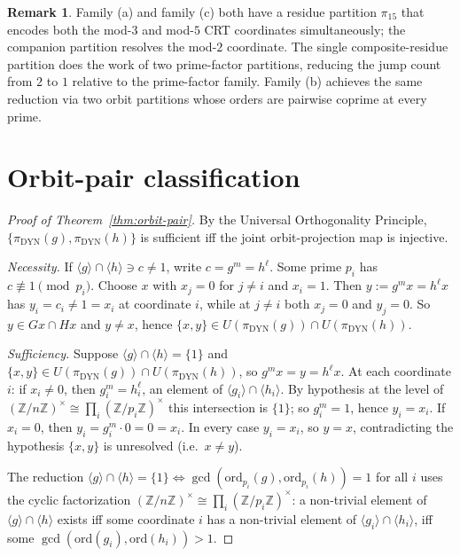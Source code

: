 \documentclass[11pt,reqno]{amsart}
\theoremstyle{plain}
\theoremstyle{definition}
\newtheorem{remark}[theorem]{Remark}
\newcommand{\Z}{\mathbb{Z}}
\newcommand{\Zns}{(\Z/n\Z)^{\times}}
\newcommand{\DYN}{\mathrm{DYN}}
\newcommand{\ord}{\mathrm{ord}}
\begin{document}
\begin{remark}
Family (a) and family (c) both have a residue partition $\pi_{15}$ that encodes both the mod-$3$ and mod-$5$ CRT coordinates simultaneously; the companion partition resolves the mod-$2$ coordinate. The single composite-residue partition does the work of two prime-factor partitions, reducing the jump count from $2$ to $1$ relative to the prime-factor family. Family (b) achieves the same reduction via two orbit partitions whose orders are pairwise coprime at every prime.
\end{remark}

\section{Orbit-pair classification} \label{sec:orbit-pair}

\begin{proof}[Proof of Theorem~\ref{thm:orbit-pair}]
By the Universal Orthogonality Principle, $\{\pi_{\DYN}(g), \pi_{\DYN}(h)\}$ is sufficient iff the joint orbit-projection map is injective.

\emph{Necessity.} If $\langle g \rangle \cap \langle h \rangle \ni c \neq 1$, write $c = g^m = h^{\ell}$. Some prime $p_i$ has $c \not\equiv 1 \pmod{p_i}$. Choose $x$ with $x_j = 0$ for $j \neq i$ and $x_i = 1$. Then $y := g^m x = h^{\ell} x$ has $y_i = c_i \neq 1 = x_i$ at coordinate $i$, while at $j \neq i$ both $x_j = 0$ and $y_j = 0$. So $y \in Gx \cap Hx$ and $y \neq x$, hence $\{x,y\} \in U(\pi_{\DYN}(g)) \cap U(\pi_{\DYN}(h))$.

\emph{Sufficiency.} Suppose $\langle g \rangle \cap \langle h \rangle = \{1\}$ and $\{x,y\} \in U(\pi_{\DYN}(g)) \cap U(\pi_{\DYN}(h))$, so $g^m x = y = h^{\ell} x$. At each coordinate $i$: if $x_i \neq 0$, then $g_i^m = h_i^{\ell}$, an element of $\langle g_i \rangle \cap \langle h_i \rangle$. By hypothesis at the level of $\Zns \cong \prod_i (\Z/p_i\Z)^{\times}$ this intersection is $\{1\}$; so $g_i^m = 1$, hence $y_i = x_i$. If $x_i = 0$, then $y_i = g_i^m \cdot 0 = 0 = x_i$. In every case $y_i = x_i$, so $y = x$, contradicting the hypothesis $\{x,y\}$ is unresolved (i.e.\ $x \neq y$).

The reduction $\langle g \rangle \cap \langle h \rangle = \{1\} \iff \gcd(\ord_{p_i}(g), \ord_{p_i}(h)) = 1$ for all $i$ uses the cyclic factorization $\Zns \cong \prod_i (\Z/p_i\Z)^{\times}$: a non-trivial element of $\langle g \rangle \cap \langle h \rangle$ exists iff some coordinate $i$ has a non-trivial element of $\langle g_i \rangle \cap \langle h_i \rangle$, iff some $\gcd(\ord(g_i), \ord(h_i)) > 1$.
\end{proof}
\end{document}
